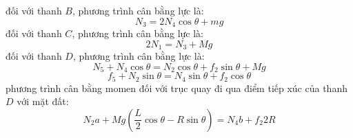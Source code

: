 \noindent đối với thanh $B$, phương trình cân bằng lực là:
\begin{equation}
  \label{eq:45}
  N_{3}=2N_{4}\cos\theta+mg
\end{equation}
đối với thanh $C$, phương trình cân bằng lực là:
\begin{equation}
  \label{eq:46}
  2N_{1}=N_{3}+Mg
\end{equation}
đối với thanh $D$, phương trình cân bằng lực là:
\begin{equation}
  \label{eq:47}
  N_{5}+N_{4}\cos\theta=N_{2}\cos\theta+f_{2}\sin\theta+Mg
\end{equation}
\begin{equation}
  \label{eq:48}
  f_{5}+N_{2}\sin\theta=N_{4}\sin\theta+f_{2}\cos\theta
\end{equation}
phương trình cân bằng momen đối với trục quay đi qua điểm tiếp xúc của thanh $D$ với mặt đất:
\begin{equation}
  \label{eq:49}
  N_{2}a+Mg\left(\frac{L}{2}\cos\theta-R\sin\theta\right)=N_{4}b+f_{2}2R
\end{equation}

